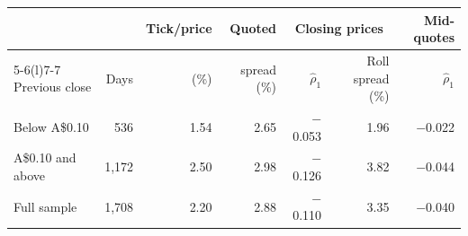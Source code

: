 \begin{tabular}{@{}lrrrrrr@{}}
\toprule
 & & Tick/price & Quoted & \multicolumn{2}{c}{Closing prices} & Mid-quotes \\
\cmidrule(lr){5-6}\cmidrule(l){7-7}
Previous close & Days & (\%) & spread (\%) & $\hat\rho_1$ & Roll spread (\%) & $\hat\rho_1$ \\
\midrule
Below A\$0.10 & 536 & 1.54 & 2.65 & $-$0.053 & 1.96 & $-$0.022 \\
A\$0.10 and above & 1{,}172 & 2.50 & 2.98 & $-$0.126 & 3.82 & $-$0.044 \\
\midrule
Full sample & 1{,}708 & 2.20 & 2.88 & $-$0.110 & 3.35 & $-$0.040 \\
\bottomrule
\end{tabular}
